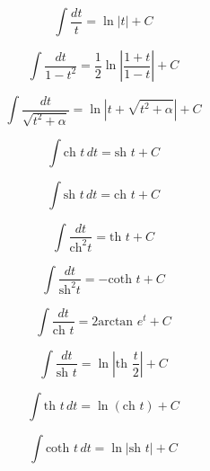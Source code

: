 \documentclass[10pt,class=article,crop=false]{standalone}
\begin{document}
{\begin{multicols}{2}
	
	$$\int \frac{dt}{t} = \ln|t|+C$$
	
	$$\int \frac{dt}{1-t^2} = \frac{1}{2}\ln \left| \frac{1+t}{1-t} \right| +C$$
	
	$$\int \frac{dt}{\sqrt{t^2+\alpha}} = \ln \left| t+\sqrt{t^2+\alpha} \right| +C$$
	
	$$\int \text{ch } t \, dt = \text{sh } t +C$$
	
	$$\int \text{sh } t \, dt = \text{ch } t +C$$
	
	$$\int \frac{dt}{\text{ch}^2 t} = \text{th } t +C$$
	
	$$\int \frac{dt}{\text{sh}^2 t} = -\text{coth } t +C$$
	
	$$\int \frac{dt}{\text{ch } t} = 2\text{arctan }e^t +C$$
	
	\vspace{2mm}
	
	$$\int \frac{dt}{\text{sh } t} = \ln \left| \text{th } \frac{t}{2} \right| +C$$
	
	$$\int \text{th } t \, dt =  \ln \left( \text{ch } t \right) +C$$
	
	$$\int \text{coth } t \, dt = \ln \left| \text{sh } t \right| +C$$
\end{multicols}

}
\end{document}
